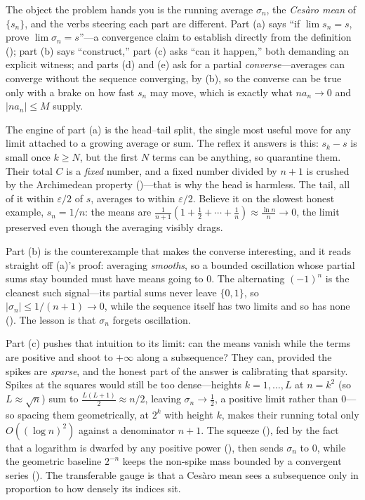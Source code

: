 \documentclass[main.tex]{subfiles}
\begin{document}
\begin{Reflection}
The object the problem hands you is the running average $\sigma_{n}$, the \emph{Ces\`aro mean} of
$\{s_{n}\}$, and the verbs steering each part are different. Part (a) says ``if $\lim s_{n}=s$, prove
$\lim\sigma_{n}=s$''---a convergence claim to establish directly from the definition (); part
(b) says ``construct,'' part (c) asks ``can it happen,'' both demanding an explicit witness; and parts (d)
and (e) ask for a partial \emph{converse}---averages can converge without the sequence converging, by (b),
so the converse can be true only with a brake on how fast $s_{n}$ may move, which is exactly what
$na_{n}\to 0$ and $|na_{n}|\le M$ supply.

The engine of part (a) is the head--tail split, the single most useful move for any limit attached to a
growing average or sum. The reflex it answers is this: $s_{k}-s$ is small once $k\ge N$, but the first
$N$ terms can be anything, so quarantine them. Their total $C$ is a \emph{fixed} number, and a fixed
number divided by $n+1$ is crushed by the Archimedean property ()---that is why the head is harmless. The tail, all of it within $\varepsilon/2$ of $s$, averages
to within $\varepsilon/2$. Believe it on the slowest honest example, $s_{n}=1/n$: the means are
$\frac{1}{n+1}(1+\tfrac12+\cdots+\tfrac1n)\approx\frac{\ln n}{n}\to 0$, the limit preserved even though
the averaging visibly drags.

Part (b) is the counterexample that makes the converse interesting, and it reads straight off (a)'s proof:
averaging \emph{smooths}, so a bounded oscillation whose partial sums stay bounded must have means going to
$0$. The alternating $(-1)^{n}$ is the cleanest such signal---its partial sums never leave $\{0,1\}$, so
$|\sigma_{n}|\le 1/(n+1)\to 0$, while the sequence itself has two limits and so has none
(). The lesson is that $\sigma_{n}$ forgets oscillation.

Part (c) pushes that intuition to its limit: can the means vanish while the terms are positive and shoot to
$+\infty$ along a subsequence? They can, provided the spikes are \emph{sparse}, and the honest part of the
answer is calibrating that sparsity. Spikes at the squares would still be too dense---heights $k=1,\dots,L$
at $n=k^{2}$ (so $L\approx\sqrt n$) sum to $\tfrac{L(L+1)}{2}\approx n/2$, leaving $\sigma_{n}\to\tfrac12$,
a positive limit rather than $0$---so spacing them
geometrically, at $2^{k}$ with height $k$, makes their running total only $O((\log n)^{2})$ against a
denominator $n+1$. The squeeze (), fed by the fact that a logarithm is dwarfed by any positive
power (), then sends $\sigma_{n}$ to $0$, while the geometric baseline $2^{-n}$ keeps the
non-spike mass bounded by a convergent series (). The transferable gauge is that a Ces\`aro
mean sees a subsequence only in proportion to how densely its indices sit.


\end{Reflection}
\end{document}
